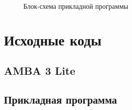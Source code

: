 \documentclass[12pt, a4paper] {ncc}
\begin{document}
\begin{figure}[h!]
\begin{tikzpicture}[node distance=4em, auto]
        \end{tikzpicture}
        \caption{Блок-схема прикладной программы}
\end{figure}

\section{Исходные коды}

\subsection{AMBA 3 Lite}



\subsection{Прикладная программа}



\end{document}
